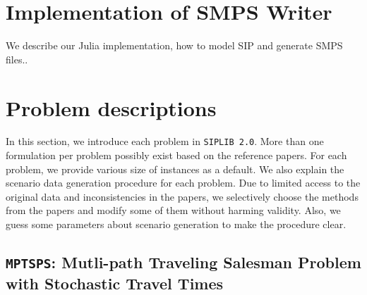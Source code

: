 \section{Implementation of SMPS Writer}

We describe our Julia implementation, how to model SIP and generate SMPS files..


\section{Problem descriptions} \label{sec:prob_desc}

In this section, we introduce each problem in \texttt{SIPLIB 2.0}. More than one formulation per problem possibly exist based on the reference papers. For each problem, we provide various size of instances as a default. We also explain the scenario data generation procedure for each problem. Due to limited access to the original data and inconsistencies in the papers, we selectively choose the methods from the papers and modify some of them without harming validity. Also, we guess some parameters about scenario generation to make the procedure clear.  %
\subsection{\texttt{MPTSPS}: Mutli-path Traveling Salesman Problem with Stochastic Travel Times}
